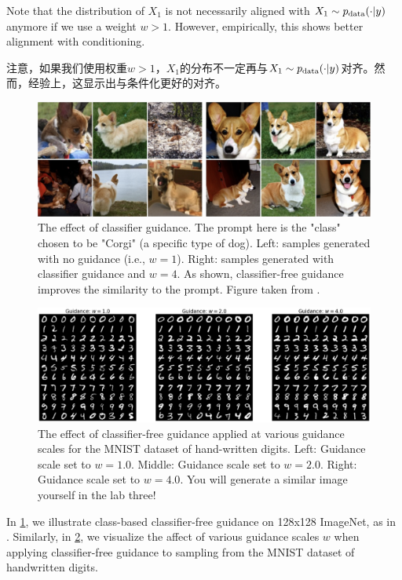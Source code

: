 Note that the distribution of $X_1$ is not necessarily aligned with $X_1 \sim  p_{\rm{data}}(\cdot | y)$ anymore if we use a weight $w>1$. However, empirically, this shows better alignment with conditioning.

注意，如果我们使用权重$w>1$，$X_1$的分布不一定再与$X_1 \sim  p_{\rm{data}}(\cdot | y)$对齐。然而，经验上，这显示出与条件化更好的对齐。
\begin{figure}[!t]
    \centering
    \includegraphics[width=\linewidth]{figures/salimans_cfg.png}
    \caption{The effect of classifier guidance. The prompt here is the "class" chosen to be "Corgi" (a specific type of dog). Left: samples generated with no guidance (i.e., $w = 1$). Right: samples generated with classifier guidance and $w = 4$. As shown, classifier-free guidance improves the similarity to the prompt. Figure taken from \cite{cfg}.}
    \label{fig:guidance}
\end{figure}
\begin{figure}[!t]
    \centering
    \includegraphics[width=\linewidth]{figures/guidance.png}
    \caption{The effect of classifier-free guidance applied at various guidance scales for the MNIST dataset of hand-written digits. Left: Guidance scale set to $w = 1.0$. Middle: Guidance scale set to $w = 2.0$. Right: Guidance scale set to $w = 4.0$. You will generate a similar image yourself in the lab three!}
    \label{fig:mnist_guidance}
\end{figure}
In \cref{fig:guidance}, we illustrate class-based classifier-free guidance on 128x128 ImageNet, as in \cite{cfg}. Similarly, in \cref{fig:mnist_guidance}, we visualize the affect of various guidance scales $w$ when applying classifier-free guidance to sampling from the MNIST dataset of handwritten digits.

